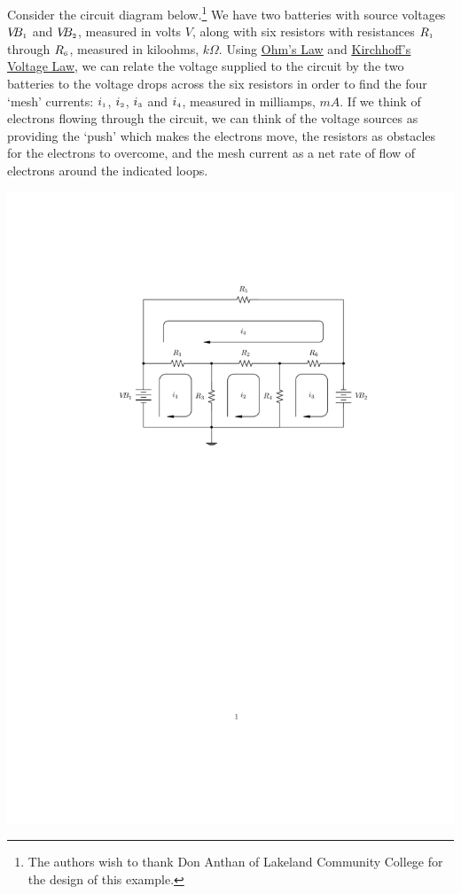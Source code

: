 \begin{ex} \label{circuitex} Consider the circuit diagram below.\footnote{The authors wish to thank Don Anthan of Lakeland Community College for the design of this example.}   We have two batteries with source voltages $V\!\!B_{\mbox{\tiny$1$}}$ and $V\!\!B_{\mbox{\tiny$2$}}$, measured in volts $V$, along with six resistors with resistances $R_{\mbox{\tiny$1$}}$ through $R_{\mbox{\tiny$6$}}$, measured in kiloohms, $k\Omega$.  Using \href{http://en.wikipedia.org/wiki/Ohm's_law}{\underline{Ohm's Law}}   and \href{http://en.wikipedia.org/wiki/Kirchhoff's_circuit_laws}{\underline{Kirchhoff's Voltage Law}}, we can relate the voltage supplied to the circuit by the two batteries to the voltage drops across the six resistors in order to find the four `mesh' currents: $i_{\mbox{\tiny$1$}}$, $i_{\mbox{\tiny$2$}}$, $i_{\mbox{\tiny$3$}}$ and $i_{\mbox{\tiny$4$}}$, measured in milliamps, $mA$.  If we think of electrons flowing through the circuit, we can think of the voltage sources as providing the `push' which makes the electrons move, the resistors as obstacles for the electrons to overcome, and the mesh current as a net rate of flow of electrons around the indicated loops.


\centerline{\includegraphics{./MatricesGraphics/CircuitDiagram01.pdf}}


\end{ex}
